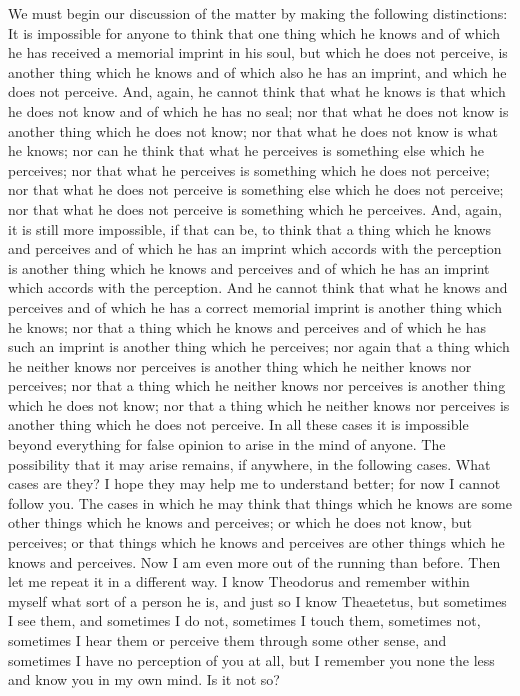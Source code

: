 \documentclass[letterpaper,12pt]{article}
\newcommand{\stephpag}[1]{\marginnote{\small\itshape\fontfamily{ppl}\selectfont #1}}
\begin{document}
\begin{drama}
We must begin our discussion of the matter by making the following distinctions: It is impossible for anyone to think that one thing which he knows and of which he has received a memorial imprint in his soul, but which he does not perceive, is another thing which he knows and of which also he has an imprint, and which he does not perceive. And, again, he cannot think that what he knows is that which he does not know and of which he has no seal; nor that what he does not know is another thing which he does not know; nor that what he does not know is what he knows; nor can he think that what he perceives is something else which he perceives; nor that what he perceives is something which he does not perceive; nor that what he does not perceive is something else which he does not perceive; nor that what he does not perceive \stephpag{b} is something which he perceives. And, again, it is still more impossible, if that can be, to think that a thing which he knows and perceives and of which he has an imprint which accords with the perception is another thing which he knows and perceives and of which he has an imprint which accords with the perception. And he cannot think that what he knows and perceives and of which he has a correct memorial imprint is another thing which he knows; nor that a thing which he knows and perceives and of which he has such an imprint is another thing which he perceives; \stephpag{c} nor again that a thing which he neither knows nor perceives is another thing which he neither knows nor perceives; nor that a thing which he neither knows nor perceives is another thing which he does not know; nor that a thing which he neither knows nor perceives is another thing which he does not perceive. In all these cases it is impossible beyond everything for false opinion to arise in the mind of anyone. The possibility that it may arise remains, if anywhere, in the following cases.
\theaetetusspeaks
What cases are they? I hope they may help me to understand better; for now I cannot follow you.
\socratesspeaks
The cases in which he may think that things which he knows are some other things which he knows and perceives; or which he does not know, but perceives; or that things which he knows and perceives are other things which \stephpag{d} he knows and perceives.
\theaetetusspeaks
Now I am even more out of the running than before.
\socratesspeaks
Then let me repeat it in a different way. I know Theodorus and remember within myself what sort of a person he is, and just so I know Theaetetus, but sometimes I see them, and sometimes I do not, sometimes I touch them, sometimes not, sometimes I hear them or perceive them through some other sense, and sometimes I have no perception of you at all, but I remember you none the less and know you in my own mind. Is it not so? \stephpag{e}

\end{drama}
\end{document}
